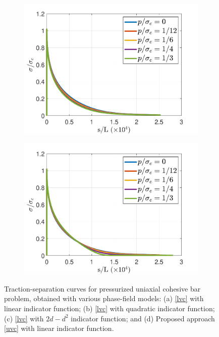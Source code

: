 \begin{figure}[h]
\bigskip
\begin{subfigure}{.45\textwidth}
  \centering
  \includegraphics[width=\linewidth]{images/traction_separation/1d_bourdin_I_2d.pdf}
  \caption{}
  \label{fig:traction_separation_bourdin_2d}
\end{subfigure}
\begin{subfigure}{.45\textwidth}
  \centering
  \includegraphics[width=\linewidth]{images/traction_separation/1d_gary_I_d.pdf}
  \caption{}
  \label{fig:traction_separation_gary}
\end{subfigure}
  \caption{Traction-separation curves for pressurized uniaxial cohesive bar problem, obtained with various phase-field models: (a) \eqref{lvc} with linear indicator function; (b) \eqref{lvc} with quadratic indicator function; (c) \eqref{lvc} with $2d-d^2$ indicator function; and (d) Proposed approach \eqref{uvc} with linear indicator function. } 
  \label{fig:traction_separation_results}
\end{figure}

